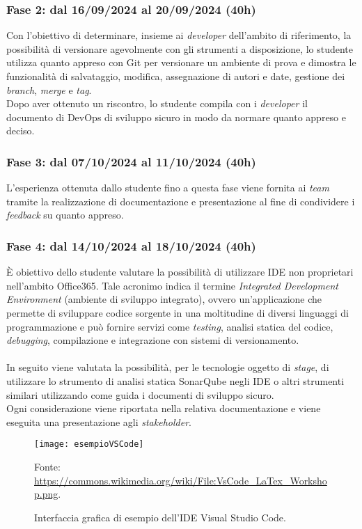 \subsubsection*{Fase 2: dal 16/09/2024 al 20/09/2024 (40h) }
Con l'obiettivo di determinare, insieme ai \emph{developer} dell'ambito di riferimento, la possibilità di versionare agevolmente con gli strumenti a disposizione, lo studente utilizza quanto appreso con Git per versionare un ambiente di prova e dimostra le funzionalità di salvataggio, modifica, assegnazione di autori e date, gestione dei \emph{branch}, \emph{merge} e \emph{tag}.\\
Dopo aver ottenuto un riscontro, lo studente compila con i \emph{developer} il documento di \gls{DevOps} di sviluppo sicuro in modo da normare quanto appreso e deciso.

\subsubsection*{Fase 3: dal 07/10/2024 al 11/10/2024 (40h) }
L'esperienza ottenuta dallo studente fino a questa fase viene fornita ai \emph{team} tramite la realizzazione di documentazione e presentazione al fine di condividere i \emph{feedback} su quanto appreso.

\subsubsection*{Fase 4: dal 14/10/2024 al 18/10/2024 (40h) }
È obiettivo dello studente valutare la possibilità di utilizzare IDE non proprietari nell'ambito Office365. Tale acronimo indica il termine \emph{Integrated Development Environment} (ambiente di sviluppo integrato), ovvero un'applicazione che permette di sviluppare codice sorgente in una moltitudine di diversi linguaggi di programmazione e può fornire servizi come \emph{testing}, analisi statica del codice, \emph{debugging}, compilazione e integrazione con sistemi di versionamento.\\\\
In seguito viene valutata la possibilità, per le tecnologie oggetto di \emph{stage}, di utilizzare lo strumento di analisi statica SonarQube negli IDE o altri strumenti similari utilizzando come guida i documenti di sviluppo sicuro.\\
Ogni considerazione viene riportata nella relativa documentazione e viene eseguita una presentazione agli \emph{stakeholder}.
\begin{figure}[htbp] 
    \centering 
    \texttt{[image: esempioVSCode]}
    \caption{Interfaccia grafica di esempio dell'IDE Visual Studio Code.} 
    \label{fig:esempioVSCode}
    \vspace{1mm}
    Fonte: \url{https://commons.wikimedia.org/wiki/File:VsCode_LaTex_Workshop.png}.
\end{figure}
